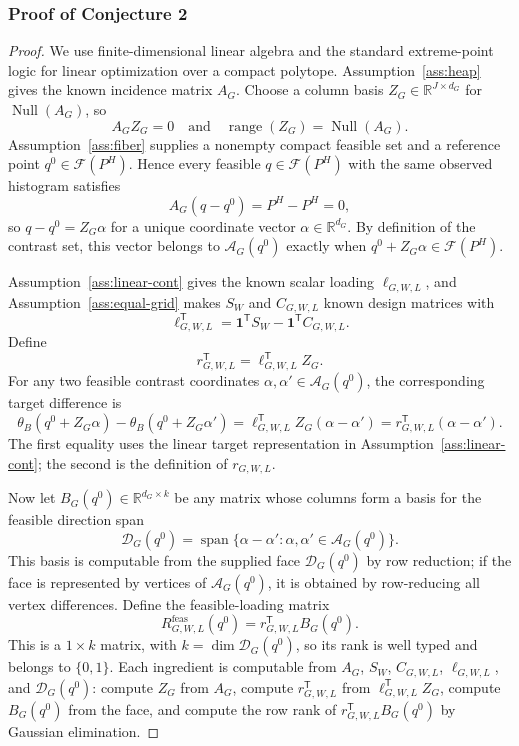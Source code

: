 \documentclass[11pt]{article}
\newcommand{\one}{\mathbf{1}}
\newcommand{\transpose}{\mathsf{T}}
\theoremstyle{definition}
\theoremstyle{plain}
\theoremstyle{remark}
\begin{document}
\subsubsection*{Proof of Conjecture 2}
\begin{proof}
We use finite-dimensional linear algebra and the standard extreme-point logic for linear optimization over a compact polytope.  Assumption~\ref{ass:heap} gives the known incidence matrix \(A_G\).  Choose a column basis \(Z_G\in\mathbb{R}^{J\times d_G}\) for \(\operatorname{Null}(A_G)\), so
\[
A_GZ_G=0
\quad\text{and}\quad
\operatorname{range}(Z_G)=\operatorname{Null}(A_G).
\]
Assumption~\ref{ass:fiber} supplies a nonempty compact feasible set and a reference point \(q^0\in\mathcal{F}(P^H)\).  Hence every feasible \(q\in\mathcal{F}(P^H)\) with the same observed histogram satisfies
\[
A_G(q-q^0)=P^H-P^H=0,
\]
so \(q-q^0=Z_G\alpha\) for a unique coordinate vector \(\alpha\in\mathbb{R}^{d_G}\).  By definition of the contrast set, this vector belongs to \(\mathcal{A}_G(q^0)\) exactly when \(q^0+Z_G\alpha\in\mathcal{F}(P^H)\).

Assumption~\ref{ass:linear-cont} gives the known scalar loading \(\ell_{G,W,L}\), and Assumption~\ref{ass:equal-grid} makes \(S_W\) and \(C_{G,W,L}\) known design matrices with
\[
\ell_{G,W,L}^{\transpose}=\one^{\transpose}S_W-\one^{\transpose}C_{G,W,L}.
\]
Define
\[
r_{G,W,L}^{\transpose}=\ell_{G,W,L}^{\transpose}Z_G .
\]
For any two feasible contrast coordinates \(\alpha,\alpha'\in\mathcal{A}_G(q^0)\), the corresponding target difference is
\[
\theta_B(q^0+Z_G\alpha)-\theta_B(q^0+Z_G\alpha')
=\ell_{G,W,L}^{\transpose}Z_G(\alpha-\alpha')
=r_{G,W,L}^{\transpose}(\alpha-\alpha').
\]
The first equality uses the linear target representation in Assumption~\ref{ass:linear-cont}; the second is the definition of \(r_{G,W,L}\).

Now let \(B_G(q^0)\in\mathbb{R}^{d_G\times k}\) be any matrix whose columns form a basis for the feasible direction span
\[
\mathcal{D}_G(q^0)=\operatorname{span}\{\alpha-\alpha':\alpha,\alpha'\in\mathcal{A}_G(q^0)\}.
\]
This basis is computable from the supplied face \(\mathcal{D}_G(q^0)\) by row reduction; if the face is represented by vertices of \(\mathcal{A}_G(q^0)\), it is obtained by row-reducing all vertex differences.  Define the feasible-loading matrix
\[
R^{\mathrm{feas}}_{G,W,L}(q^0)=r_{G,W,L}^{\transpose}B_G(q^0).
\]
This is a \(1\times k\) matrix, with \(k=\dim\mathcal{D}_G(q^0)\), so its rank is well typed and belongs to \(\{0,1\}\).  Each ingredient is computable from \(A_G\), \(S_W\), \(C_{G,W,L}\), \(\ell_{G,W,L}\), and \(\mathcal{D}_G(q^0)\): compute \(Z_G\) from \(A_G\), compute \(r_{G,W,L}^{\transpose}\) from \(\ell_{G,W,L}^{\transpose}Z_G\), compute \(B_G(q^0)\) from the face, and compute the row rank of \(r_{G,W,L}^{\transpose}B_G(q^0)\) by Gaussian elimination.


\end{proof}
\end{document}

